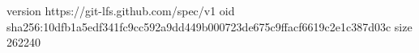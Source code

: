 version https://git-lfs.github.com/spec/v1
oid sha256:10dfb1a5edf341fc9cc592a9dd449b000723de675c9ffacf6619c2e1c387d03c
size 262240
